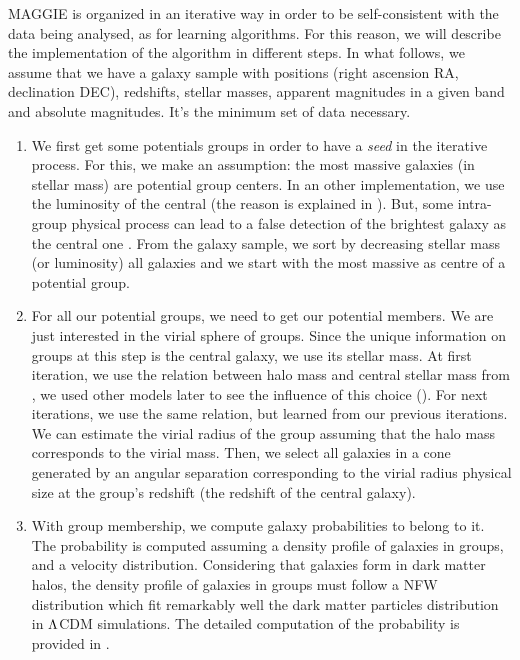 MAGGIE is organized in an iterative way in order to be self-consistent with
the data being analysed, as for learning algorithms. For this reason, we
will describe the implementation of the algorithm in different steps. In
what follows, we assume that we have a galaxy sample with
positions (right ascension RA, declination DEC), redshifts, stellar masses,
apparent magnitudes in a given band and absolute magnitudes. It's the
minimum set of data necessary.
%
\begin{enumerate}
    \item We first get some potentials groups in order to have a \emph{seed}
        in the iterative process. For this, we make an assumption: the most
        massive galaxies (in stellar mass) are potential group centers. In
        an other implementation, we use the luminosity of the central (the
        reason is explained in ). But,
        some intra-group physical process can lead to a false detection of
        the brightest galaxy as the central one \citep{Ebeling+13}. From the
        galaxy sample, we sort by decreasing stellar mass (or luminosity)
        all galaxies and we start with the most massive as centre of a
        potential group.

    \item\label{step:2} For all our potential groups, we need to get our
        potential members. We are just interested in the virial sphere of
        groups. Since the unique information on groups at this step is the
        central galaxy, we use its stellar mass. At first iteration, we use
        the relation between halo mass and central stellar mass from
        \citet{BCW+10}, we used other models later to see the influence of
        this choice (). For next iterations,
        we use the same relation, but learned from our previous iterations.
        We can estimate the virial radius of the group assuming
        that the halo mass corresponds to the virial mass. Then, we select
        all galaxies in a cone generated by an angular separation
        corresponding to the virial radius physical size at the group's
        redshift (the redshift of the central galaxy).

    \item With group membership, we compute galaxy probabilities to belong
        to it. The probability is computed assuming a density profile of
        galaxies in groups, and a velocity distribution. Considering that
        galaxies form in dark matter halos, the density profile of
        galaxies in groups must follow a NFW distribution \citep{NFW+97}
        which fit remarkably well the dark matter particles distribution in
        $\rm \Lambda$CDM simulations. The detailed computation of the
        probability is provided in .


\end{enumerate}
